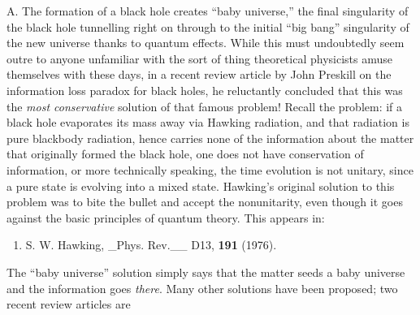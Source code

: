 \documentclass{article}
\def\tightlist{}
\renewcommand{\texttt}[1]{%
  \begingroup
  \ttfamily
  \begingroup\lccode`~=`/\lowercase{\endgroup\def~}{/\discretionary{}{}{}}%
  \begingroup\lccode`~=`[\lowercase{\endgroup\def~}{[\discretionary{}{}{}}%
  \begingroup\lccode`~=`.\lowercase{\endgroup\def~}{.\discretionary{}{}{}}%
  \catcode`/=\active\catcode`[=\active\catcode`.=\active
  \scantokens{#1\noexpand}%
  \endgroup
}
\begin{document}
A. The formation of a black hole creates ``baby universe,'' the final
singularity of the black hole tunnelling right on through to the initial
``big bang'' singularity of the new universe thanks to quantum effects.
While this must undoubtedly seem outre to anyone unfamiliar with the
sort of thing theoretical physicists amuse themselves with these days,
in a recent review article by John Preskill on the information loss
paradox for black holes, he reluctantly concluded that this was the
\emph{most conservative} solution of that famous problem! Recall the
problem: if a black hole evaporates its mass away via Hawking radiation,
and that radiation is pure blackbody radiation, hence carries none of
the information about the matter that originally formed the black hole,
one does not have conservation of information, or more technically
speaking, the time evolution is not unitary, since a pure state is
evolving into a mixed state. Hawking's original solution to this problem
was to bite the bullet and accept the nonunitarity, even though it goes
against the basic principles of quantum theory. This appears in:

\begin{enumerate}
\def\labelenumi{\arabic{enumi})}
\setcounter{enumi}{1}
\tightlist
\item
  S. W. Hawking, \_Phys. Rev.\_\_ D13, \textbf{191} (1976).
\end{enumerate}

The ``baby universe'' solution simply says that the matter seeds a baby
universe and the information goes \emph{there}. Many other solutions
have been proposed; two recent review articles are

\end{document}
